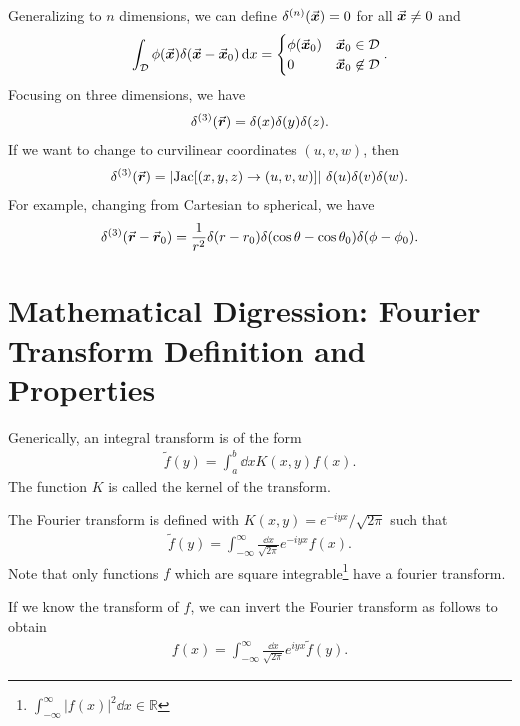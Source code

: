 Generalizing to $n$ dimensions, we can define $\delta^{(n)}(\va*{x}) = 0$ for all $\va*{x} \ne 0$ and
\begin{eqnarray}
    \int_{\mathcal{D}} \phi(\va*{x}) \delta(\va*{x} - \va*{x}_{0}) \dd{x} = \begin{cases}
        \phi(\va*{x}_{0}) & \va*{x}_{0} \in \mathcal{D} \\
        0 & \va*{x}_{0} \not\in \mathcal{D}
    \end{cases}
.\end{eqnarray}
Focusing on three dimensions, we have
\begin{eqnarray}
    \delta^{(3)}(\va*{r}) = \delta(x) \delta(y) \delta(z)
.\end{eqnarray}
If we want to change to curvilinear coordinates $(u,v,w)$, then
\begin{eqnarray}
    \delta^{(3)}(\va*{r}) = |{\rm Jac}[(x,y,z) \rightarrow (u,v,w)]| ~ \delta(u) \delta(v) \delta(w)
.\end{eqnarray}
For example, changing from Cartesian to spherical, we have
\begin{eqnarray}
    \delta^{(3)}(\va*{r} - \va*{r}_{0}) = \frac{1}{r^2} \delta(r - r_0) \delta(\cos{\theta} - \cos{\theta_0}) \delta(\phi - \phi_0)
.\end{eqnarray}


\section{Mathematical Digression: Fourier Transform Definition and Properties}

Generically, an integral transform is of the form
\begin{eqnarray}
    \tilde{f}(y) = \int_{a}^{b} \dd{x} K(x,y) f(x)
.\end{eqnarray}
The function $K$ is called the kernel of the transform.

The Fourier transform is defined with $K(x,y) = e^{-iyx}/\sqrt{2\pi}$ such that
\begin{eqnarray}
    \tilde{f}(y) = \int_{-\infty}^{\infty} \frac{\dd{x}}{\sqrt{2\pi}} e^{-iyx} f(x)
.\end{eqnarray}
Note that only functions $f$ which are square integrable\footnote{$\int_{-\infty}^{\infty} |f(x)|^2 \dd{x} \in \mathbb{R}$} have a fourier transform.

If we know the transform of $f$, we can invert the Fourier transform as follows to obtain
\begin{eqnarray}
    f(x) = \int_{-\infty}^{\infty} \frac{\dd{x}}{\sqrt{2 \pi}} e^{iyx} \tilde{f}(y)
.\end{eqnarray}


